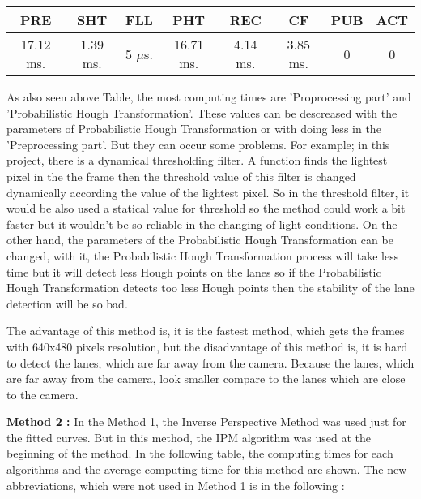 \begin{center}
  \begin{tabular}{ | c | c | c | c | c | c | c | c |}
    \hline
  
  PRE & SHT & FLL & PHT & REC & CF & PUB & ACT \\ \hline  
  17.12 ms. & 1.39 ms. & 5 $\mu$s. & 16.71 ms. & 4.14 ms. & 3.85 ms. & 0 & 0 \\ \hline  
    
    
      \end{tabular}
  \label{tab:Case1_Times}
\end{center}

As also seen above Table, the most computing times are 'Proprocessing part' and 'Probabilistic Hough Transformation'. These values can be descreased with the parameters of Probabilistic Hough Transformation or with doing less in the 'Preprocessing part'. But they can occur some problems. For example; in this project, there is a dynamical thresholding filter. A function finds the lightest pixel in the the frame then the threshold value of this filter is changed dynamically according the value of the lightest pixel. So in the threshold filter,  it would be also used a statical value for threshold so the method could work a bit faster but it wouldn't be so reliable in the changing of light conditions. On the other hand, the parameters of the Probabilistic Hough Transformation can be changed, with it, the Probabilistic Hough Transformation process will take less time but it will detect less Hough points on the lanes so if the Probabilistic Hough Transformation detects too less Hough points then the stability of the lane detection will be so bad.

The advantage of this method is, it is the fastest method, which gets the frames with 640x480 pixels resolution, but the disadvantage of this method is, it is hard to detect the lanes, which are far away from the camera. Because the lanes, which are far away from the camera, look smaller compare to the lanes which are close to the camera.




\textbf{Method 2 : }In the Method 1, the Inverse Perspective Method was used just for the fitted curves. But in this method, the IPM algorithm was used at the beginning of the method. In the following table, the computing times for each algorithms and the average computing time for this method are shown. The new abbreviations, which were not used in Method 1 is in the following :


